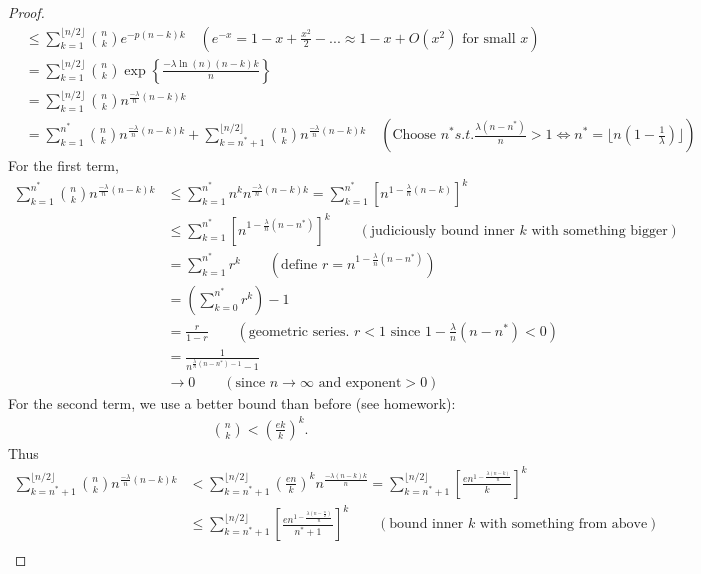 \documentclass[./some_latex_template.tex]{subfiles}
\begin{document}
\begin{proof}
\begin{align*}
	&\le \sum_{k=1}^{\lfloor n/2 \rfloor} {n \choose k} e^{-p(n-k)k} \quad \left(e^{-x} = 1 - x + \frac{x^2}{2} - ... \approx 1 - x + O(x^2) \text{ for small }x\right)\\
	&= \sum_{k=1}^{\lfloor n/2 \rfloor} {n \choose k} \exp\left\{\frac{-\lambda \ln(n)(n-k)k}{n}\right\}\\
	&= \sum_{k=1}^{\lfloor n/2 \rfloor} {n \choose k} n^{\frac{-\lambda}{n}(n-k)k}\\
	&= \sum_{k=1}^{n^*} {n \choose k} n^{\frac{-\lambda}{n}(n-k)k} + \sum_{k=n^* + 1}^{\lfloor n/2 \rfloor} {n \choose k} n^{\frac{-\lambda}{n}(n-k)k} \quad \left(\text{Choose } n^* s.t. \frac{\lambda(n - n^*)}{n}>1 \iff n^* = \lfloor n(1 - \frac{1}{\lambda}) \rfloor\right)
\end{align*}
For the first term, 
\begin{align*}
	\sum_{k=1}^{n^*} {n \choose k} n^{\frac{-\lambda}{n}(n-k)k}
	&\le \sum_{k=1}^{n^*} n^k n^{\frac{-\lambda}{n}(n-k)k} = \sum_{k=1}^{n^*} \left[ n^{1 - \frac{\lambda}{n}(n-k)} \right]^k\\
	&\le \sum_{k=1}^{n^*} \left[ n^{1 - \frac{\lambda}{n}(n-n^*)} \right]^k \qquad \left(\text{judiciously bound inner } k \text{ with something bigger}\right)\\
	&= \sum_{k=1}^{n^*} r^k \qquad \left(\text{define } r = n^{1 - \frac{\lambda}{n}(n-n^*)}\right)\\
	&= \left(\sum_{k=0}^{n^*} r^k\right) - 1\\
	&= \frac{r}{1-r} \qquad \left(\text{geometric series. } r < 1 \text{ since } 1 - \frac{\lambda}{n}(n-n^*) < 0\right)\\
	&= \frac{1}{n^{\frac{\lambda}{n}(n-n^*) - 1} - 1}\\
	&\longrightarrow 0 \qquad \left(\text{since } n \rightarrow \infty \text{ and exponent} > 0\right)
\end{align*}
For the second term, we use a better bound than before (see homework):
\begin{align*}
	{n \choose k} < \left(\frac{ek}{k}\right)^k.
\end{align*}
Thus 
\begin{align*}
	\sum_{k=n^* + 1}^{\lfloor n/2 \rfloor} {n \choose k} n^{\frac{-\lambda}{n}(n-k)k} 
	&< \sum_{k=n^* + 1}^{\lfloor n/2 \rfloor} \left(\frac{en}{k}\right)^k n^{\frac{-\lambda(n-k)k}{n}} = \sum_{k=n^* + 1}^{\lfloor n/2 \rfloor} \left[ \frac{en^{1 - \frac{\lambda(n-k)}{n}}}{k}\right]^k\\
	&\le \sum_{k=n^* + 1}^{\lfloor n/2 \rfloor} \left[ \frac{en^{1-\frac{\lambda (n - \frac{n}{2})}{n}}}{n^* + 1}\right]^k \qquad (\text{bound inner } k \text{  with something from above})\\

\end{align*}
\end{proof}
\end{document}
